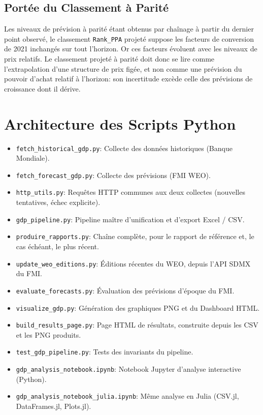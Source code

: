\documentclass[11pt,a4paper]{article}
\begin{document}
\subsection{Portée du Classement à Parité}
Les niveaux de prévision à parité étant obtenus par chaînage à partir du dernier point observé, le classement \texttt{Rank\_PPA} projeté suppose les facteurs de conversion de 2021 inchangés sur tout l'horizon. Or ces facteurs évoluent avec les niveaux de prix relatifs. Le classement projeté à parité doit donc se lire comme l'extrapolation d'une structure de prix figée, et non comme une prévision du pouvoir d'achat relatif à l'horizon: son incertitude excède celle des prévisions de croissance dont il dérive.

\section{Architecture des Scripts Python}

\begin{itemize}
    \item \texttt{fetch\_historical\_gdp.py}: Collecte des données historiques (Banque Mondiale).
    \item \texttt{fetch\_forecast\_gdp.py}: Collecte des prévisions (FMI WEO).
    \item \texttt{http\_utils.py}: Requêtes HTTP communes aux deux collectes (nouvelles tentatives, échec explicite).
    \item \texttt{gdp\_pipeline.py}: Pipeline maître d'unification et d'export Excel / CSV.
    \item \texttt{produire\_rapports.py}: Chaîne complète, pour le rapport de référence et, le cas échéant, le plus récent.
    \item \texttt{update\_weo\_editions.py}: Éditions récentes du WEO, depuis l'API SDMX du FMI.
    \item \texttt{evaluate\_forecasts.py}: Évaluation des prévisions d'époque du FMI.
    \item \texttt{visualize\_gdp.py}: Génération des graphiques PNG et du Dashboard HTML.
    \item \texttt{build\_results\_page.py}: Page HTML de résultats, construite depuis les CSV et les PNG produits.
    \item \texttt{test\_gdp\_pipeline.py}: Tests des invariants du pipeline.
    \item \texttt{gdp\_analysis\_notebook.ipynb}: Notebook Jupyter d'analyse interactive (Python).
    \item \texttt{gdp\_analysis\_notebook\_julia.ipynb}: Même analyse en Julia (CSV.jl, DataFrames.jl, Plots.jl).
\end{itemize}
\end{document}
